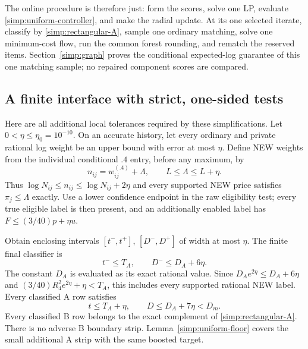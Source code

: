 The online procedure is therefore just: form the scores, solve one
LP, evaluate \eqref{simp:uniform-controller}, and make the radial
update.  At its one selected iterate, classify by
\eqref{simp:rectangular-A}, sample one ordinary matching, solve one
minimum-cost flow, run the common forest rounding, and rematch the
reserved items.  Section~\ref{simp:graph} proves the conditional
expected-log guarantee of this one matching sample; no repaired
component scores are compared.

\subsection{A finite interface with strict, one-sided tests}

Here are all additional local tolerances required by these
simplifications.  Let $0<\eta\le\eta_0=10^{-10}$.  On an accurate
history, let every ordinary and private rational log weight be an
upper bound with error at most $\eta$.  Define NEW weights from the
individual conditional $.4$ entry, before any maximum, by
\[
       n_{ij}=w^{(.4)}_{ij}+\Lambda,
       \qquad L\le\Lambda\le L+\eta.
\]
Thus $\log N_{ij}\le n_{ij}\le\log N_{ij}+2\eta$ and every
supported NEW price satisfies $\pi_j\le\Lambda$ exactly.
Use a lower confidence endpoint in the raw eligibility test;
every true eligible label is then present, and an additionally
enabled label has $F\le(3/40)p+\eta u$.

Obtain enclosing intervals $[t^-,t^+]$, $[D^-,D^+]$ of width
at most $\eta$.  The finite final classifier is
\begin{equation}\label{simp:finite-rectangle}
       t^-\le T_A,\qquad D^-\le D_A+6\eta.
\end{equation}
The constant $D_A$ is evaluated as its exact rational value. Since
$D_Ae^{2\eta}\le D_A+6\eta$ and
$(3/40)R_4^2e^{2\eta}+\eta<T_A$, this includes every supported
rational NEW label.  Every classified A row satisfies
\[
       t\le T_A+\eta,\qquad
       D\le D_A+7\eta<D_m.
\]
Every classified B row belongs to the exact complement of
\eqref{simp:rectangular-A}.  There is no adverse B boundary strip.
Lemma~\ref{simp:uniform-floor} covers the small additional A strip
with the same boosted target.


